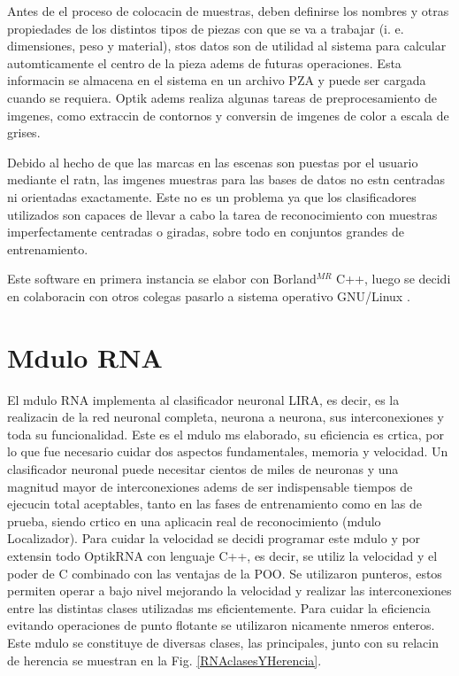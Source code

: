 \begin{figure}[h]
\end{figure}

Antes de el proceso de colocacin de muestras, deben definirse los
nombres y otras propiedades de los distintos tipos de piezas con que
se va a trabajar (i. e. dimensiones, peso y material), stos datos son
de utilidad al sistema para calcular automticamente el centro de la
pieza adems de futuras operaciones. Esta informacin se almacena en
el sistema en un archivo PZA y puede ser cargada cuando se
requiera. Optik adems realiza algunas tareas de preprocesamiento de
imgenes, como extraccin de contornos y conversin de imgenes de
color a escala de grises.

Debido al hecho de que las marcas en las escenas son puestas por el usuario mediante el ratn, las imgenes muestras para las bases de datos no estn centradas ni orientadas exactamente. Este no es un problema ya que los clasificadores utilizados son capaces de llevar a cabo la tarea de reconocimiento con muestras imperfectamente centradas o giradas, sobre todo en conjuntos grandes de entrenamiento.

Este software en primera instancia se elabor con Borland$^{MR}$ C++, luego se decidi en colaboracin con otros colegas pasarlo a sistema operativo GNU/Linux \cite{Josue2006}.

\section{Mdulo RNA}
El mdulo RNA implementa al clasificador neuronal LIRA, es decir, es
la realizacin de la red neuronal completa, neurona a neurona, sus
interconexiones y toda su funcionalidad. Este es el mdulo ms
elaborado, su eficiencia es crtica, por lo que fue necesario cuidar
dos aspectos fundamentales, memoria y velocidad. Un clasificador
neuronal puede necesitar cientos de miles de neuronas y una magnitud
mayor de interconexiones adems de ser indispensable tiempos de
ejecucin total aceptables, tanto en las fases de entrenamiento como
en las de prueba, siendo crtico en una aplicacin real de
reconocimiento (mdulo Localizador). Para cuidar la velocidad se
decidi programar este mdulo y por extensin todo OptikRNA con
lenguaje C++, es decir, se utiliz la velocidad y el poder de C
combinado con las ventajas de la POO. Se utilizaron punteros, estos
permiten operar a bajo nivel mejorando la velocidad y realizar las
interconexiones entre las distintas clases utilizadas ms
eficientemente. Para cuidar la eficiencia evitando operaciones de
punto flotante se utilizaron nicamente nmeros enteros. Este mdulo
se constituye de diversas clases, las principales, junto con su
relacin de herencia se muestran en la Fig. \ref{RNAclasesYHerencia}.

